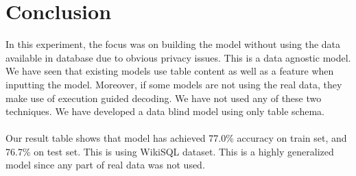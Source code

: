 \documentclass[12pt]{article}
\begin{document}
\section{Conclusion}
In this experiment, the focus was on building the model without using the data available in database due to obvious privacy issues. This is a data agnostic model. We have seen that existing models use table content as well as a feature when inputting the model. Moreover, if some models are not using the real data, they make use of execution guided decoding. We have not used any of these two techniques. We have developed a data blind model using only table schema. 
\\
\\
Our result table shows that model has achieved 77.0\% accuracy on train set, and 76.7\% on test set. This is using WikiSQL dataset. This is a highly generalized model since any part of real data was not used. 



\end{document}
